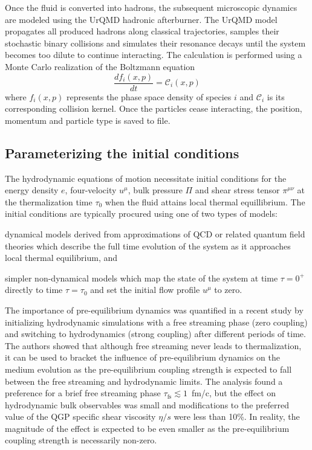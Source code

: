 \documentclass[aps,prc,reprint,amsmath,nofootinbib]{revtex4-1}
\begin{document}
Once the fluid is converted into hadrons, the subsequent microscopic dynamics are modeled using the UrQMD hadronic afterburner.
The UrQMD model propagates all produced hadrons along classical trajectories, samples their stochastic binary collisions and simulates their resonance decays until the system becomes too dilute to continue interacting.
The calculation is performed using a Monte Carlo realization of the Boltzmann equation
\begin{equation}
    \frac{df_i(x,p)}{dt} = \mathcal{C}_i(x, p)
\end{equation}
where $f_i(x,p)$ represents the phase space density of species $i$ and $\mathcal{C}_i$ is its corresponding collision kernel.
Once the particles cease interacting, the position, momentum and particle type is saved to file.

\subsection{Parameterizing the initial conditions}


The hydrodynamic equations of motion necessitate initial conditions for the energy density $e$, four-velocity $u^\mu$, bulk pressure $\Pi$ and shear stress tensor $\pi^{\mu\nu}$ at the thermalization time $\tau_0$ when the fluid attains local thermal equillibrium. The initial conditions are typically procured using one of two types of models:
\begin{enumerate*}[label={\arabic*)}]
    \item dynamical models derived from approximations of QCD or related quantum field theories which describe the full time evolution of the system as it approaches local thermal equilibrium, and 
    \item simpler non-dynamical models which map the state of the system at time $\tau=0^+$ directly to time $\tau=\tau_0$ and set the initial flow profile $u^\mu$ to zero.
\end{enumerate*}

The importance of pre-equilibrium dynamics was quantified in a recent study by initializing hydrodynamic simulations with a free streaming phase (zero coupling) and switching to hydrodynamics (strong coupling) after different periods of time. The authors showed that although free streaming never leads to thermalization, it can be used to bracket the influence of pre-equilibrium dynamics on the medium evolution as the pre-equilibrium coupling strength is expected to fall between the free streaming and hydrodynamic limits. The analysis found a preference for a brief free streaming phase ${\tau_\text{fs} \lesssim 1}$~fm/c, but the effect on hydrodynamic bulk observables was small and modifications to the preferred value of the QGP specific shear viscosity $\eta/s$ were less than 10\%. In reality, the magnitude of the effect is expected to be even smaller as the pre-equilibrium coupling strength is necessarily non-zero.
\end{document}
